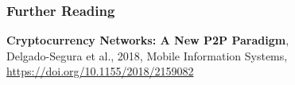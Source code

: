 \documentclass[handout]{beamer}
\begin{document}
\begin{frame}%
\frametitle{Further Reading}
		\textbf{Cryptocurrency Networks: A New P2P Paradigm}, \\
		Delgado-Segura et al., 2018, Mobile Information Systems, \\
		\link \url{https://doi.org/10.1155/2018/2159082}
\end{frame}
\end{document}

